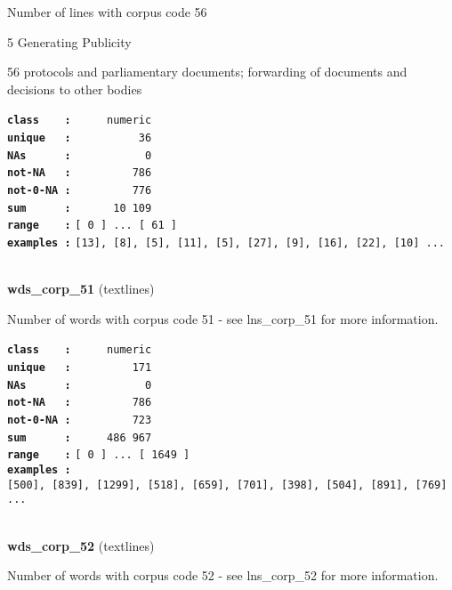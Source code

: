 \documentclass[]{article}
\begin{document}
Number of lines with corpus code 56

5 Generating Publicity

56 protocols and parliamentary documents; forwarding of documents and
decisions to other bodies

\textbf{\texttt{class\ \ \ \ :}} \texttt{~~~~~numeric}\\
\textbf{\texttt{unique\ \ \ :}} \texttt{~~~~~~~~~~36}\\
\textbf{\texttt{NAs\ \ \ \ \ \ :}} \texttt{~~~~~~~~~~~0}\\
\textbf{\texttt{not-NA\ \ \ :}} \texttt{~~~~~~~~~786}\\
\textbf{\texttt{not-0-NA\ :}} \texttt{~~~~~~~~~776}\\
\textbf{\texttt{sum\ \ \ \ \ \ :}} \texttt{~~~~~~10~109}\\
\textbf{\texttt{range\ \ \ \ :}}
\texttt{{[}\ 0\ {]}\ ...\ {[}\ 61\ {]}}\\
\textbf{\texttt{examples\ :}}
\texttt{{[}13{]},\ {[}8{]},\ {[}5{]},\ {[}11{]},\ {[}5{]},\ {[}27{]},\ {[}9{]},\ {[}16{]},\ {[}22{]},\ {[}10{]}\ ...}\\

~

\textbf{wds\_corp\_51} (textlines)

Number of words with corpus code 51 - see lns\_corp\_51 for more
information.

\textbf{\texttt{class\ \ \ \ :}} \texttt{~~~~~numeric}\\
\textbf{\texttt{unique\ \ \ :}} \texttt{~~~~~~~~~171}\\
\textbf{\texttt{NAs\ \ \ \ \ \ :}} \texttt{~~~~~~~~~~~0}\\
\textbf{\texttt{not-NA\ \ \ :}} \texttt{~~~~~~~~~786}\\
\textbf{\texttt{not-0-NA\ :}} \texttt{~~~~~~~~~723}\\
\textbf{\texttt{sum\ \ \ \ \ \ :}} \texttt{~~~~~486~967}\\
\textbf{\texttt{range\ \ \ \ :}}
\texttt{{[}\ 0\ {]}\ ...\ {[}\ 1649\ {]}}\\
\textbf{\texttt{examples\ :}}
\texttt{{[}500{]},\ {[}839{]},\ {[}1299{]},\ {[}518{]},\ {[}659{]},\ {[}701{]},\ {[}398{]},\ {[}504{]},\ {[}891{]},\ {[}769{]}\ ...}\\

~

\textbf{wds\_corp\_52} (textlines)

Number of words with corpus code 52 - see lns\_corp\_52 for more
information.
\end{document}
